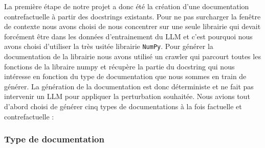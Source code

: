 \documentclass[11pt, a4paper]{article}
\begin{document}
La première étape de notre projet a donc été la création d'une documentation contrefactuelle à partir des docstrings existants. Pour ne pas surcharger la fenêtre de contexte nous avons choisi de nous concentrer sur une seule librairie qui devait forcément être dans les données d'entrainement du LLM et c'est pourquoi nous avons choisi d'utiliser la très usitée librairie \texttt{NumPy}. Pour générer la documentation de la librairie nous avons utilisé un crawler qui parcourt toutes les fonctions de la libraire numpy et récupère la partie du docstring qui nous intéresse en fonction du type de documentation que nous sommes en train de générer. La génération de la documentation est donc déterministe et ne fait pas intervenir un LLM pour appliquer la perturbation souhaitée. Nous avions tout d'abord choisi de générer cinq types de documentations à la fois factuelle et contrefactuelle :
\vspace{0.5cm}

\subsubsection{Type de documentation}
\end{document}

